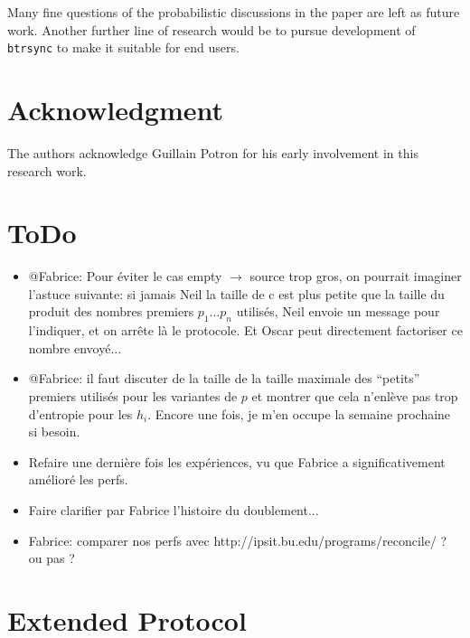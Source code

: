 \documentclass[11pt]{llncs}
\newcommand{\btrsync}{\texttt{btrsync}\xspace}
\newcommand{\comm}[1]{\marginpar{%
\vskip-\baselineskip %
\raggedright\footnotesize
\itshape\hrule\smallskip#1\par\smallskip\hrule}}
\begin{document}
Many fine questions of the probabilistic discussions in the paper are left as future work.\comm{Be more specific!} Another further line of research would be to pursue development of \btrsync to make it suitable for end users.

\section{Acknowledgment}

The authors acknowledge Guillain Potron for his early involvement in this research work.\smallskip

\section{ToDo}

\begin{itemize}

\item @Fabrice: Pour éviter le cas empty $\rightarrow$ source trop gros, on pourrait imaginer l'astuce suivante: si jamais Neil la taille de c est plus petite que la taille du produit des nombres premiers $p_1$...$p_n$ utilisés, Neil envoie un message pour l'indiquer, et on arr\^ete là le protocole. Et Oscar peut directement factoriser ce nombre envoyé...

\item @Fabrice: il faut discuter de la taille de la taille maximale des ``petits'' premiers utilisés pour les variantes de $p$ et montrer que cela n'enlève pas trop d'entropie pour les $h_i$. Encore une fois, je m'en occupe la semaine prochaine si besoin.

\item Refaire une dernière fois les expériences, vu que Fabrice a significativement amélioré les perfs.

\item Faire clarifier par Fabrice l'histoire du doublement...

\item Fabrice: comparer nos perfs avec http://ipsit.bu.edu/programs/reconcile/ ? ou pas ?

\end{itemize}

\nocite{rsync}
\nocite{wagner}



\appendix

\section{Extended Protocol}
\label{sec:extended}
\end{document}
